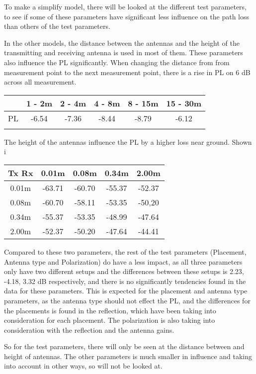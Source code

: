 To make a simplify model, there will be looked at the different test parameters, to see if some of these parameters have significant less influence on the path loss than others of the test parameters.

In the other models, the distance between the antennas and the height of the transmitting and receiving antenna is used in most of them. These parameters also influence the PL significantly. When changing the distance from from measurement point to the next measurement point, there is a rise in PL on 6 dB across all measurement.

\begin{tabular}{|c|c|c|c|c|c|}
\hline
   & 1 - 2m & 2 - 4m & 4 - 8m & 8 - 15m & 15 - 30m \\
\hline
PL & -6.54 & -7.36 & -8.44 & -8.79 & -6.12 \\
\hline
\caption{•}
\end{tabular}

The height of the antennas influence the PL by a higher loss near ground. Shown i

\begin{tabular}{|c|c|c|c|c|}
\hline
Tx Rx & 0.01m & 0.08m & 0.34m & 2.00m \\
\hline
0.01m & -63.71 & -60.70 & -55.37 & -52.37\\
\hline
0.08m & -60.70 & -58.11 & -53.35 & -50,20\\
\hline
0.34m & -55.37 & -53.35 & -48.99 & -47.64\\
\hline
2.00m & -52.37 & -50.20 & -47.64 & -44.41\\
\hline
\end{tabular}

Compared to these two parameters, the rest of the test parameters (Placement, Antenna type and Polarization) do have a less impact, as all three parameters only have two different setups and the differences between these setups is 2.23, -4.18, 3.32 dB respectively, and there is no significantly tendencies found in the data for these parameters. This is expected for the placement and antenna type parameters, as the antenna type should not effect the PL, and the differences for the placements is found in the reflection, which have been taking into consideration for each placement. The polarization is also taking into consideration with the reflection and the antenna gains.

So for the test parameters, there will only be seen at the distance between and height of antennas. The other parameters is much smaller in influence and taking into account in other ways, so will not be looked at.

